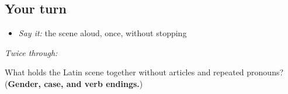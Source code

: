 \subsection*{Your turn}
\begin{itemize}
\raggedright
  \item \emph{Say it:} the scene aloud, once, without stopping
\end{itemize}

\emph{Twice through:}

\begin{tcolorbox}[breakable,colback=teal!4,colframe=teal!35!black,title={Before you move on}]
What holds the Latin scene together without articles and repeated pronouns? (\textbf{Gender, case, and verb endings.})
\end{tcolorbox}
